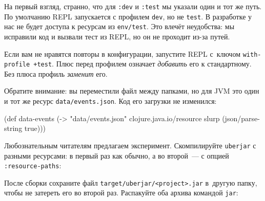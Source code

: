 \fi

На первый взгляд, странно, что для \verb|:dev| и \verb|:test| мы указали один
и тот же путь. По умолчанию REPL запускается с профилем \verb|dev|, но не
\verb|test|. В разработке у нас не будет доступа к ресурсам из
\verb|env/test|. Это влечёт неудобства: мы исправили код и вызвали тест из
REPL, но он не проходит из-за путей.


Если вам не нравятся повторы в конфигурации, запустите REPL с~ключом
\verb|with-profile +test|. Плюс перед профилем означает \emph{добавить} его к
стандартному. Без плюса профиль \emph{заменит} его.


Обратите внимание: вы переместили файл между папками, но для JVM это один и тот
же ресурс \verb|data/events.json|. Код его загрузки не изменился:

\begin{english}
  \begin{clojure}
(def data-events
  (-> "data/events.json"
      clojure.java.io/resource
      slurp
      (json/parse-string true)))
  \end{clojure}
\end{english}

Любознательным читателям предлагаем эксперимент. Скомпилируйте \verb|uberjar|
с разными ресурсами: в первый раз как обычно, а во второй~--- с опцией
\verb|:resource-paths|:

\ifx\devicetype\mobile

\begin{english}
  \begin{clojure}
:profiles
  {:uberjar {:resource-paths
             ["env/test/resources"]}
  \end{clojure}
\end{english}

\else

\begin{english}
  \begin{clojure}
:profiles {:uberjar {:resource-paths ["env/test/resources"]}
  \end{clojure}
\end{english}

\fi

После сборки сохраните файл \verb|target/uberjar/<project>.jar| в~другую папку,
чтобы не затереть его во второй раз. Распакуйте оба архива командой \verb|jar|:

\begin{english}
\end{english}

